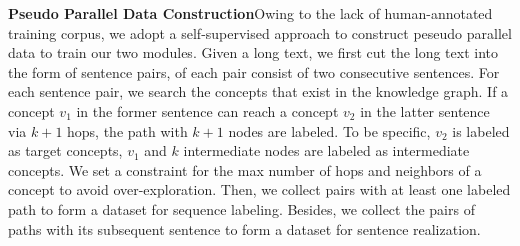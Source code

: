 \documentclass[letterpaper]{article} %
\begin{document}
\medskip\noindent\textbf{Pseudo Parallel Data Construction}\hspace{1em}Owing to the lack of human-annotated training corpus, we adopt a self-supervised approach to construct peseudo parallel data to train our two modules. 
Given a long text, we first cut the long text into the form of sentence pairs, of each pair consist of two consecutive sentences.
For each sentence pair, we search the concepts that exist in the knowledge graph. If a concept $v_1$ in the former sentence can reach a concept $v_2$ in the latter sentence via $k+1$ hops, the path with $k+1$ nodes are labeled. To be specific, $v_2$ is labeled as target concepts, $v_1$ and $k$ intermediate nodes are labeled as intermediate concepts. We set a constraint for the  max number of hops and neighbors of a concept to avoid over-exploration. Then, we collect  pairs with at least one labeled path to form a dataset for sequence labeling. Besides, we collect the pairs of paths with its subsequent sentence to form a dataset for sentence realization.
\end{document}
